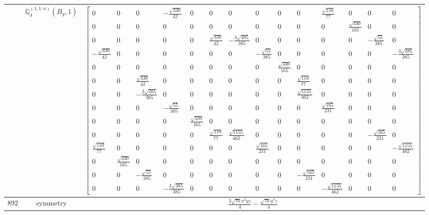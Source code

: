 \documentclass[fleqn,8pt,landscape]{jsarticle}
\begin{document}
\begin{longtable}{ccc}
$  $ & $ \mathbb{Q}_{4}^{(1,1;a)}(B_{g},1) $ & $ \begin{bmatrix} 0 & 0 & 0 & - \frac{\sqrt{330}}{42} & 0 & 0 & 0 & 0 & 0 & 0 & \frac{\sqrt{110}}{77} & 0 & 0 & 0 \\ 0 & 0 & 0 & 0 & 0 & 0 & 0 & 0 & 0 & 0 & 0 & \frac{\sqrt{330}}{165} & 0 & 0 \\ 0 & 0 & 0 & 0 & 0 & \frac{\sqrt{330}}{42} & - \frac{3 \sqrt{385}}{385} & 0 & 0 & 0 & 0 & 0 & - \frac{\sqrt{55}}{385} & 0 \\ - \frac{\sqrt{330}}{42} & 0 & 0 & 0 & 0 & 0 & 0 & - \frac{\sqrt{55}}{385} & 0 & 0 & 0 & 0 & 0 & - \frac{3 \sqrt{385}}{385} \\ 0 & 0 & 0 & 0 & 0 & 0 & 0 & 0 & \frac{\sqrt{330}}{165} & 0 & 0 & 0 & 0 & 0 \\ 0 & 0 & \frac{\sqrt{330}}{42} & 0 & 0 & 0 & 0 & 0 & 0 & \frac{\sqrt{110}}{77} & 0 & 0 & 0 & 0 \\ 0 & 0 & - \frac{3 \sqrt{385}}{385} & 0 & 0 & 0 & 0 & 0 & 0 & \frac{\sqrt{1155}}{462} & 0 & 0 & 0 & 0 \\ 0 & 0 & 0 & - \frac{\sqrt{55}}{385} & 0 & 0 & 0 & 0 & 0 & 0 & \frac{\sqrt{165}}{231} & 0 & 0 & 0 \\ 0 & 0 & 0 & 0 & \frac{\sqrt{330}}{165} & 0 & 0 & 0 & 0 & 0 & 0 & 0 & 0 & 0 \\ 0 & 0 & 0 & 0 & 0 & \frac{\sqrt{110}}{77} & \frac{\sqrt{1155}}{462} & 0 & 0 & 0 & 0 & 0 & - \frac{\sqrt{165}}{231} & 0 \\ \frac{\sqrt{110}}{77} & 0 & 0 & 0 & 0 & 0 & 0 & \frac{\sqrt{165}}{231} & 0 & 0 & 0 & 0 & 0 & - \frac{\sqrt{1155}}{462} \\ 0 & \frac{\sqrt{330}}{165} & 0 & 0 & 0 & 0 & 0 & 0 & 0 & 0 & 0 & 0 & 0 & 0 \\ 0 & 0 & - \frac{\sqrt{55}}{385} & 0 & 0 & 0 & 0 & 0 & 0 & - \frac{\sqrt{165}}{231} & 0 & 0 & 0 & 0 \\ 0 & 0 & 0 & - \frac{3 \sqrt{385}}{385} & 0 & 0 & 0 & 0 & 0 & 0 & - \frac{\sqrt{1155}}{462} & 0 & 0 & 0 \end{bmatrix} $ \\ \hline
$ 892 $ & $ \text{symmetry} $ & $ \frac{3 \sqrt{70} x^{2} y z}{4} - \frac{\sqrt{70} y^{3} z}{4} $ \\

\end{longtable}
\end{document}
